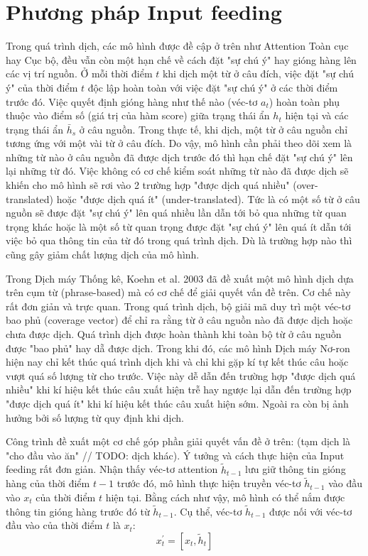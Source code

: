 \section{Phương pháp Input feeding}
Trong quá trình dịch, các mô hình được đề cập ở trên như Attention Toàn cục hay Cục bộ, đều vẫn còn một hạn chế về cách đặt "sự chú ý" hay gióng hàng lên các vị trí nguồn. Ở mỗi thời điểm $t$ khi dịch một từ ở câu đích, việc đặt "sự chú ý" của thời điểm $t$ độc lập hoàn toàn với việc đặt "sự chú ý" ở các thời điểm trước đó. Việc quyết định gióng hàng như thế nào (véc-tơ $a_t$) hoàn toàn phụ thuộc vào điểm số (giá trị của hàm score) giữa trạng thái ẩn $h_t$ hiện tại và các trạng thái ẩn $\bar{h}_s$ ở câu nguồn. Trong thực tế, khi dịch, một từ ở câu nguồn chỉ tương ứng với một vài từ ở câu đích. Do vậy, mô hình cần phải theo dõi xem là những từ nào ở câu nguồn đã được dịch trước đó thì hạn chế đặt "sự chú ý" lên lại những từ đó. Việc không có cơ chế kiểm soát những từ nào đã được dịch sẽ khiến cho mô hình sẽ rơi vào 2 trường hợp "được dịch quá nhiều" (over-translated) hoặc "được dịch quá ít" (under-translated). Tức là có một số từ ở câu nguồn sẽ được đặt "sự chú ý" lên quá nhiều lần dẫn tới bỏ qua những từ quan trọng khác hoặc là một số từ quan trọng được đặt "sự chú ý" lên quá ít dẫn tới việc bỏ qua thông tin của từ đó trong quá trình dịch. Dù là trường hợp nào thì cũng gây giảm chất lượng dịch của mô hình.

Trong Dịch máy Thống kê, Koehn et al. 2003 \cite{smtKoehn2003} đã đề xuất một mô hình dịch dựa trên cụm từ (phrase-based) mà có cơ chế để giải quyết vấn đề trên. Cơ chế này rất đơn giản và trực quan. Trong quá trình dịch, bộ giải mã duy trì một véc-tơ bao phủ (coverage vector) để chỉ ra rằng từ ở câu nguồn nào đã được dịch hoặc chưa được dịch. Quá trình dịch được hoàn thành khi toàn bộ từ ở câu nguồn được "bao phủ" hay dẵ được dịch. Trong khi đó, các mô hình Dịch máy Nơ-ron hiện nay chỉ kết thúc quá trình dịch khi và chỉ khi gặp kí tự kết thúc câu hoặc vượt quá số lượng từ cho trước. Việc này dễ dẫn đến trường hợp "được dịch quá nhiều" khi kí hiệu kết thúc câu xuất hiện trễ hay ngược lại dẫn đến trường hợp "được dịch quá ít" khi kí hiệu kết thúc câu xuất hiện sớm. Ngoài ra còn bị ảnh hưởng bởi số lượng từ quy định khi dịch.

Công trình \cite{attentionThangLuong2015} đề xuất một cơ chế góp phần giải quyết vấn đề ở trên:  (tạm dịch là "cho đầu vào ăn" // TODO: dịch khác). Ý tưởng và cách thực hiện của Input feeding rất đơn giản. Nhận thấy véc-tơ attention $\tilde{h}_{t-1}$ lưu giữ thông tin gióng hàng của thời điểm $t-1$ trước đó, mô hình thực hiện truyền véc-tơ $\tilde{h}_{t-1}$ vào đầu vào $x_t$ của thời điểm $t$ hiện tại. Bằng cách như vậy, mô hình có thể nắm được thông tin gióng hàng trước đó từ $\tilde{h}_{t-1}$. Cụ thể, véc-tơ $\tilde{h}_{t-1}$ được nối với véc-tơ đầu vào của thời điểm $t$ là $x_t$:
\begin{equation}
x^{'}_t = [x_t, \tilde{h}_t]
\end{equation}


